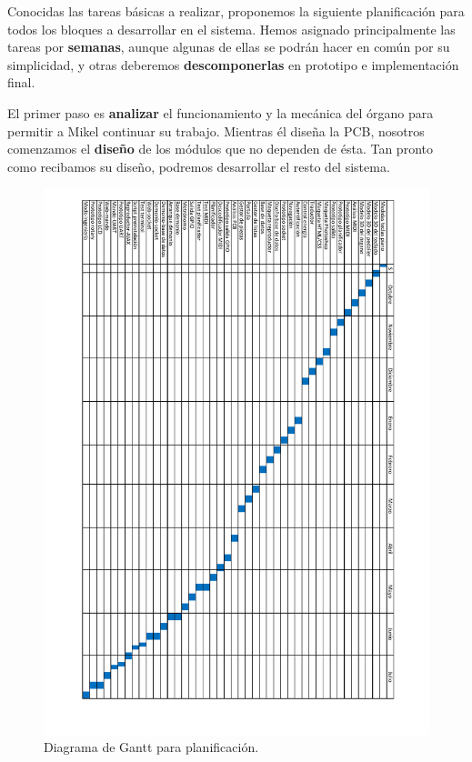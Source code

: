 Conocidas las tareas básicas a realizar, proponemos la siguiente planificación para todos los bloques a desarrollar en el sistema. Hemos asignado principalmente las tareas por \textbf{semanas}, aunque algunas de ellas se podrán hacer en común por su simplicidad, y otras deberemos \textbf{descomponerlas} en prototipo e implementación final.

El primer paso es \textbf{analizar} el funcionamiento y la mecánica del órgano para permitir a Mikel continuar su trabajo. Mientras él diseña la \acrshort{PCB}, nosotros comenzamos el \textbf{diseño} de los módulos que no dependen de ésta. Tan pronto como recibamos su diseño, podremos desarrollar el resto del sistema.

\newpage

\begin{figure}[H]
	\noindent \begin{centering}
		\includegraphics[height=\textheight]{capitulo2/gantt}
		\par\end{centering}
	\smallskip
	\caption{\label{fig:gantt} Diagrama de Gantt para planificación.}
\end{figure} 

\smallskip



\newpage
\clearpage{\pagestyle{empty}\cleardoublepage}

